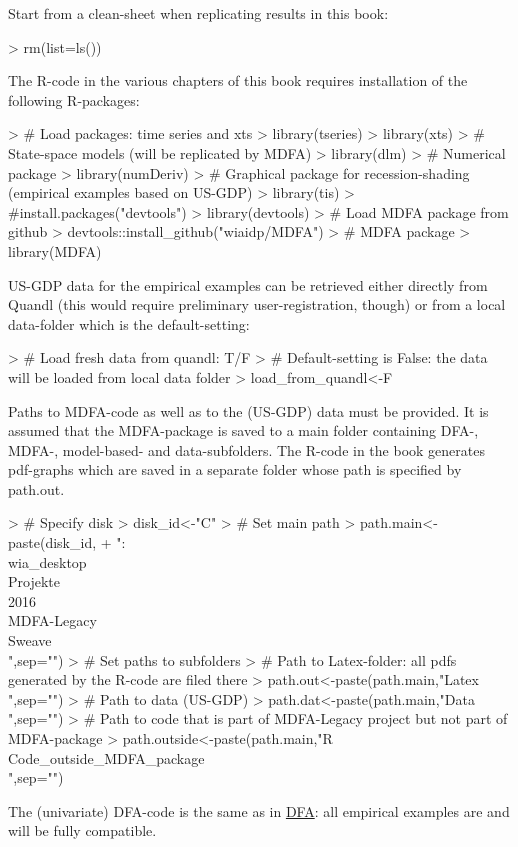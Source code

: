 \documentclass[a4paper]{book}
\begin{document}
Start from a clean-sheet when replicating results in this book:
\begin{Schunk}
\begin{Sinput}
> rm(list=ls())
\end{Sinput}
\end{Schunk}
The R-code in the various chapters of this book requires installation of the following R-packages:
\begin{Schunk}
\begin{Sinput}
> # Load packages: time series and xts
> library(tseries)
> library(xts)
> # State-space models (will be replicated by MDFA) 
> library(dlm)
> # Numerical package 
> library(numDeriv)
> # Graphical package for recession-shading (empirical examples based on US-GDP)
> library(tis) 
> #install.packages("devtools")
> library(devtools)
> # Load MDFA package from github
> devtools::install_github("wiaidp/MDFA")
> # MDFA package
> library(MDFA) 
\end{Sinput}
\end{Schunk}
US-GDP data for the empirical examples can be retrieved either directly from Quandl (this would require preliminary user-registration, though) or from a local data-folder which is the default-setting:
\begin{Schunk}
\begin{Sinput}
> # Load fresh data from quandl: T/F
> #   Default-setting is False: the data will be loaded from local data folder
> load_from_quandl<-F
\end{Sinput}
\end{Schunk}
Paths to MDFA-code as well as to the (US-GDP) data must be provided. It is assumed that the MDFA-package is saved to a main folder containing DFA-, MDFA-, model-based- and data-subfolders. The R-code in the book generates pdf-graphs which are saved in a separate folder whose path is specified by path.out.
\begin{Schunk}
\begin{Sinput}
> # Specify disk
> disk_id<-"C"
> # Set main path
> path.main<-paste(disk_id,
+       ":\\wia_desktop\\Projekte\\2016\\MDFA-Legacy\\Sweave\\",sep="")
> # Set paths to subfolders
>   # Path to Latex-folder: all pdfs generated by the R-code are filed there
> path.out<-paste(path.main,"Latex\\",sep="")
>   # Path to data (US-GDP)
> path.dat<-paste(path.main,"Data\\",sep="")
>   # Path to code that is part of MDFA-Legacy project but not part of MDFA-package 
> path.outside<-paste(path.main,"R\\Code_outside_MDFA_package\\",sep="")
\end{Sinput}
\end{Schunk}
The (univariate) DFA-code is the same as in \href{http://blog.zhaw.ch/sef/files/2014/10/DFA.pdf}{DFA}: all  empirical examples are and will be fully compatible. 
\end{document}
